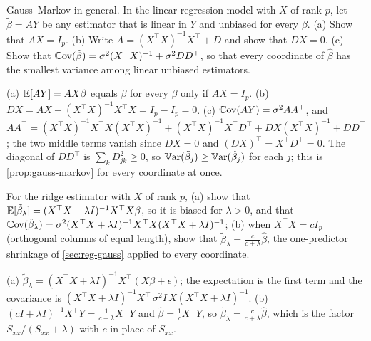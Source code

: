 \begin{exercise}
\label{ex:mreg-gm}
Gauss--Markov in general. In the linear regression model with $X$ of rank $p$, let $\tilde{\beta} = AY$ be any estimator that is linear in $Y$ and unbiased for every $\beta$. (a) Show that $AX = I_p$. (b) Write $A = (X^\top X)^{-1}X^\top + D$ and show that $DX = 0$. (c) Show that $\operatorname*{\mathbb{C}\text{ov}}(\tilde{\beta}) = \sigma^2(X^\top X)^{-1} + \sigma^2DD^\top$, so that every coordinate of $\hat{\beta}$ has the smallest variance among linear unbiased estimators.
\end{exercise}
\begin{solution}
(a) $\operatorname*{\mathbb{E}}[AY] = AX\beta$ equals $\beta$ for every $\beta$ only if $AX = I_p$. (b) $DX = AX - (X^\top X)^{-1}X^\top X = I_p - I_p = 0$. (c) $\operatorname*{\mathbb{C}\text{ov}}(AY) = \sigma^2AA^\top$, and $AA^\top = (X^\top X)^{-1}X^\top X(X^\top X)^{-1} + (X^\top X)^{-1}X^\top D^\top + DX(X^\top X)^{-1} + DD^\top$; the two middle terms vanish since $DX = 0$ and $(DX)^\top = X^\top D^\top = 0$. The diagonal of $DD^\top$ is $\sum_k D_{jk}^2 \geq 0$, so $\operatorname*{\mathbb{V}\text{ar}}(\tilde{\beta}_j) \geq \operatorname*{\mathbb{V}\text{ar}}(\hat{\beta}_j)$ for each $j$; this is \cref{prop:gauss-markov} for every coordinate at once.
\end{solution}

\begin{exercise}
\label{ex:mreg-ridge-bias}
For the ridge estimator with $X$ of rank $p$, (a) show that $\operatorname*{\mathbb{E}}[\tilde{\beta}_\lambda] = (X^\top X + \lambda I)^{-1}X^\top X\beta$, so it is biased for $\lambda > 0$, and that $\operatorname*{\mathbb{C}\text{ov}}(\tilde{\beta}_\lambda) = \sigma^2(X^\top X + \lambda I)^{-1}X^\top X(X^\top X + \lambda I)^{-1}$; (b) when $X^\top X = cI_p$ (orthogonal columns of equal length), show that $\tilde{\beta}_\lambda = \frac{c}{c + \lambda}\hat{\beta}$, the one-predictor shrinkage of \cref{sec:reg-gauss} applied to every coordinate.
\end{exercise}
\begin{solution}
(a) $\tilde{\beta}_\lambda = (X^\top X + \lambda I)^{-1}X^\top(X\beta + \epsilon)$; the expectation is the first term and the covariance is $(X^\top X + \lambda I)^{-1}X^\top\,\sigma^2I\,X(X^\top X + \lambda I)^{-1}$. (b) $(cI + \lambda I)^{-1}X^\top Y = \frac{1}{c + \lambda}X^\top Y$ and $\hat{\beta} = \frac1cX^\top Y$, so $\tilde{\beta}_\lambda = \frac{c}{c + \lambda}\hat{\beta}$, which is the factor $S_{xx}/(S_{xx} + \lambda)$ with $c$ in place of $S_{xx}$.
\end{solution}

